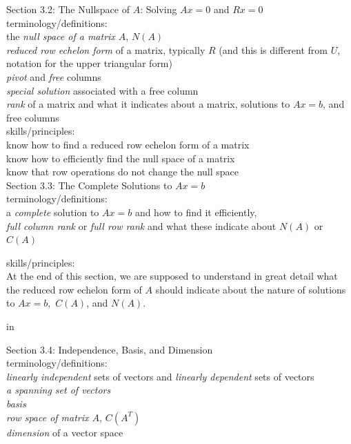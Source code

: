 \documentclass[11pt,fleqn]{article}
\begin{document}
\vskip 0.1in

\noindent Section 3.2: The Nullspace of $A$: Solving $Ax=0$ and $Rx=0$\\

terminology/definitions: \\
the \emph{null space of a matrix $A$}, $N(A)$\\
\emph{reduced row echelon form} of a matrix, typically $R$ (and this is different from $U$, notation for the upper triangular form)\\
\emph{pivot} and \emph{free} columns\\
\emph{special solution} associated with a free column\\
\emph{rank} of a matrix and what it indicates about a matrix, solutions to $Ax=b$, and free columns\\

skills/principles: \\
know how to find a reduced row echelon form of a matrix\\
know how to efficiently find the null space of a matrix\\
know that row operations do not change the null space\\

\noindent Section 3.3: The Complete Solutions to $Ax=b$ \\

terminology/definitions: \\
a \emph{complete} solution to $Ax=b$ and how to find it efficiently,\\
\emph{full column rank} or \emph{full row rank} and what these indicate about $N(A)$ or $C(A)$

skills/principles: \\
At the end of this section, we are supposed to understand in great detail what the reduced row echelon form of $A$ should indicate about the nature of solutions to $Ax=b,$ $C(A)$, and $N(A).$

 in

\noindent Section 3.4: Independence, Basis, and Dimension \\

terminology/definitions: \\
\emph{linearly independent} sets of vectors and \emph{linearly dependent} sets of vectors\\
\emph{a spanning set of vectors}\\
\emph{basis}\\
\emph{row space of matrix $A$}, $C(A^T)$\\
\emph{dimension} of a vector space\\
\end{document}
